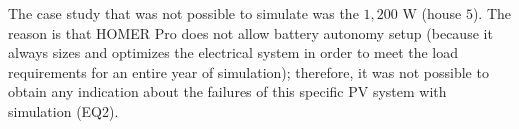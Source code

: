 The case study that was not possible to simulate was the $1,200$ W (house $5$). The reason is that HOMER Pro does not allow battery autonomy setup (because it always sizes and optimizes the electrical system in order to meet the load requirements for an entire year of simulation); therefore, it was not possible to obtain any indication about the failures of this specific PV system with simulation (EQ2).  

%
%
%

